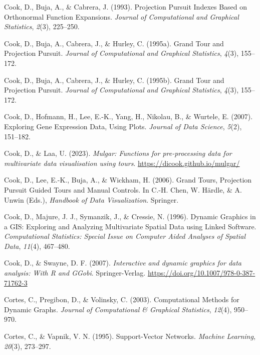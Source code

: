 \documentclass[
  letterpaper,
]{krantz}
\newlength{\cslhangindent}
\newenvironment{CSLReferences}[2] %
 {\begin{list}{}{%
  \setlength{\itemindent}{0pt}
  \setlength{\leftmargin}{0pt}
  \setlength{\parsep}{0pt}
  \ifodd #1
   \setlength{\leftmargin}{\cslhangindent}
   \setlength{\itemindent}{-1\cslhangindent}
  \fi
  \setlength{\itemsep}{#2\baselineskip}}}
 {\end{list}}
\begin{document}
\begin{CSLReferences}{1}{0}
Cook, D., Buja, A., \& Cabrera, J. (1993). {P}rojection {P}ursuit
{I}ndexes {B}ased on {O}rthonormal {F}unction {E}xpansions.
\emph{Journal of Computational and Graphical Statistics}, \emph{2}(3),
225--250.

Cook, D., Buja, A., Cabrera, J., \& Hurley, C. (1995a). Grand {T}our and
{P}rojection {P}ursuit. \emph{Journal of Computational and Graphical
Statistics}, \emph{4}(3), 155--172.

Cook, D., Buja, A., Cabrera, J., \& Hurley, C. (1995b). Grand {T}our and
{P}rojection {P}ursuit. \emph{Journal of Computational and Graphical
Statistics}, \emph{4}(3), 155--172.

Cook, D., Hofmann, H., Lee, E.-K., Yang, H., Nikolau, B., \& Wurtele, E.
(2007). Exploring {G}ene {E}xpression {D}ata, {U}sing {P}lots.
\emph{Journal of Data Science}, \emph{5}(2), 151--182.

Cook, D., \& Laa, U. (2023). \emph{Mulgar: Functions for pre-processing
data for multivariate data visualisation using tours}.
\url{https://dicook.github.io/mulgar/}

Cook, D., Lee, E.-K., Buja, A., \& Wickham, H. (2006). {G}rand {T}ours,
{P}rojection {P}ursuit {G}uided {T}ours and {M}anual {C}ontrols. In
C.-H. Chen, W. Härdle, \& A. Unwin (Eds.), \emph{Handbook of {D}ata
{V}isualization}. Springer.

Cook, D., Majure, J. J., Symanzik, J., \& Cressie, N. (1996). {D}ynamic
{G}raphics in a {GIS}: {E}xploring and {A}nalyzing {M}ultivariate
{S}patial {D}ata using {L}inked {S}oftware. \emph{Computational
Statistics: Special Issue on Computer Aided Analyses of Spatial Data},
\emph{11}(4), 467--480.

Cook, D., \& Swayne, D. F. (2007). \emph{Interactive and dynamic
graphics for data analysis: With {R} and {GGobi}}. Springer-Verlag.
\url{https://doi.org/10.1007/978-0-387-71762-3}

Cortes, C., Pregibon, D., \& Volinsky, C. (2003). Computational
{M}ethods for {D}ynamic {G}raphs. \emph{Journal of Computational \&
Graphical Statistics}, \emph{12}(4), 950--970.

Cortes, C., \& Vapnik, V. N. (1995). Support-{V}ector {N}etworks.
\emph{Machine Learning}, \emph{20}(3), 273--297.


\end{CSLReferences}
\end{document}
